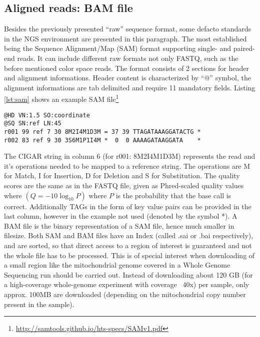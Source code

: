 \subsection{Aligned reads: BAM file}
Besides the previously presented "`raw"' sequence format, some defacto standards in the NGS environment are presented in this paragraph. The most established being the Sequence Alignment/Map (SAM) format \cite{Li2009} supporting single- and paired-end reads. It can include different raw formats not only FASTQ, such as the before mentioned color space reads. The format consists of 2 sections for header and alignment informations. Header content is characterized by "`@"' symbol, the alignment informations are tab delimited and require 11 mandatory fields. Listing \ref{lst:sam} shows an example SAM file\footnote{\url{http://samtools.github.io/hts-specs/SAMv1.pdf}} 
\begin{lstlisting}[caption= {Excerpt of a SAM file, representing two reads}, label={lst:sam}]
@HD VN:1.5 SO:coordinate
@SQ SN:ref LN:45
r001 99 ref 7 30 8M2I4M1D3M = 37 39 TTAGATAAAGGATACTG *
r002 83 ref 9 30 3S6M1P1I4M *  0  0 AAAAGATAAGGATA    *
\end{lstlisting}
The CIGAR string in column 6 (for r001: 8M2I4M1D3M) represents the read and it's operations needed to be mapped to a reference string. The operations are M for Match, I for Insertion, D for Deletion and S for Substitution. 
The quality scores are the same as in the FASTQ file, given as Phred-scaled quality values where $\left( Q=-10\log_{10} P\right)$ where $P$ is the probability that the base call is correct\cite{Loman2012}. Additionally TAGs in the form of key value pairs can be provided in the last column, however in the example not used (denoted by the symbol *).
A BAM file is the binary representation of a SAM file, hence much smaller in filesize. Both SAM and BAM files have an Index (called .sai or .bai respectively), and are sorted, so that direct access to a region of interest is guaranteed and not the whole file has to be processed. This is of special interest when downloading of a small region like the mitochondrial genome covered in a Whole Genome Sequencing run should be carried out. Instead of downloading about 120 GB (for a high-coverage whole-genome experiment with coverage ~40x) per sample, only approx. 100MB are downloaded (depending on the mitochondrial copy number present in the sample).
